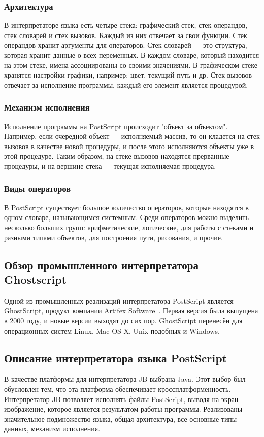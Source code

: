 \documentclass[14pt]{extarticle}
\begin{document}
	 \subsubsection*{Архитектура}
	 В интерпретаторе языка есть четыре стека: графический стек, стек операндов, стек словарей и стек вызовов. Каждый из них отвечает за свои функции. Стек операндов хранит аргументы для операторов. Стек словарей --- это структура, которая хранит данные о всех переменных. В каждом словаре, который находится на этом стеке, имена ассоциированы со своими значениями. В графическом стеке хранятся настройки графики, например: цвет, текущий путь и др. Стек вызовов отвечает за исполнение программы, каждый его элемент является процедурой.
	 \subsubsection*{Механизм исполнения}
	 Исполнение программы на PostScript происходит "объект за объектом". Например, если очередной объект --- исполняемый массив, то он кладется на стек вызовов в качестве новой процедуры, и после этого исполняются объекты уже в этой процедуре. Таким образом, на стеке вызовов находятся прерванные процедуры, и на вершине стека --- текущая исполняемая процедура.
	 \subsubsection*{Виды операторов}
	 В PostScript существует большое количество операторов, которые находятся в одном словаре, называющимся системным. Среди операторов можно выделить несколько больших групп: арифметические, логические, для работы с стеками и разными типами объектов, для построения пути, рисования, и прочие. 
 
	 \subsection{Обзор промышленного интерпретатора Ghostscript}
	 Одной из промышленных реализаций интерпретатора PostScript является GhostScript, продукт компании Artifex Software~\cite{artifex-site}. Первая версия была выпущена в 2000 году, и новые версии выходят до сих пор. GhostScript перенесён для операционных систем Linux, Mac OS X, Unix-подобных и Windows.
	\subsection{Описание интерпретатора языка PostScript}
	В качестве платформы для интерпретатора JB выбрана Java. Этот выбор был обусловлен тем, что эта платформа обеспечивает  кроссплатформенность. Интерпретатор JB позволяет исполнять файлы PostScript, выводя на экран изображение, которое является результатом работы программы. Реализованы значительное подмножество языка, общая архитектура, все основные типы данных, механизм исполнения. 
	
\end{document}
